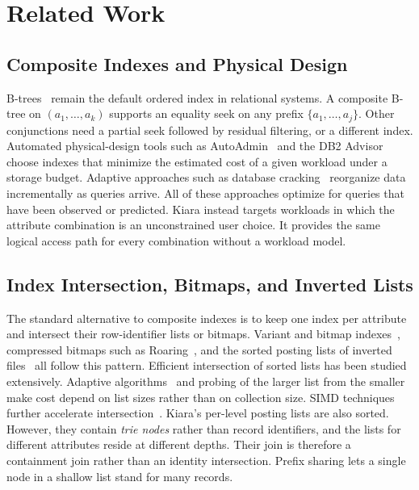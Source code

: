 \section{Related Work}
\label{sec:related}

\subsection{Composite Indexes and Physical Design}
B-trees~\cite{bayer1972organization,comer1979ubiquitous,graefe2011modern} remain the default ordered index in relational systems. A composite B-tree on $(a_1,\dots,a_k)$ supports an equality seek on any prefix $\{a_1,\dots,a_j\}$. Other conjunctions need a partial seek followed by residual filtering, or a different index. Automated physical-design tools such as AutoAdmin~\cite{chaudhuri1997efficient} and the DB2 Advisor~\cite{valentin2000db2} choose indexes that minimize the estimated cost of a given workload under a storage budget. Adaptive approaches such as database cracking~\cite{idreos2007cracking} reorganize data incrementally as queries arrive. All of these approaches optimize for queries that have been observed or predicted. Kiara instead targets workloads in which the attribute combination is an unconstrained user choice. It provides the same logical access path for every combination without a workload model.

\subsection{Index Intersection, Bitmaps, and Inverted Lists}
The standard alternative to composite indexes is to keep one index per attribute and intersect their row-identifier lists or bitmaps. Variant and bitmap indexes~\cite{oneil1997improved}, compressed bitmaps such as Roaring~\cite{lemire2016roaring}, and the sorted posting lists of inverted files~\cite{zobel2006inverted} all follow this pattern. Efficient intersection of sorted lists has been studied extensively. Adaptive algorithms~\cite{demaine2000adaptive} and probing of the larger list from the smaller~\cite{baezayates2004fast} make cost depend on list sizes rather than on collection size. SIMD techniques further accelerate intersection~\cite{lemire2016simd}. Kiara's per-level posting lists are also sorted. However, they contain \emph{trie nodes} rather than record identifiers, and the lists for different attributes reside at different depths. Their join is therefore a containment join rather than an identity intersection. Prefix sharing lets a single node in a shallow list stand for many records.

